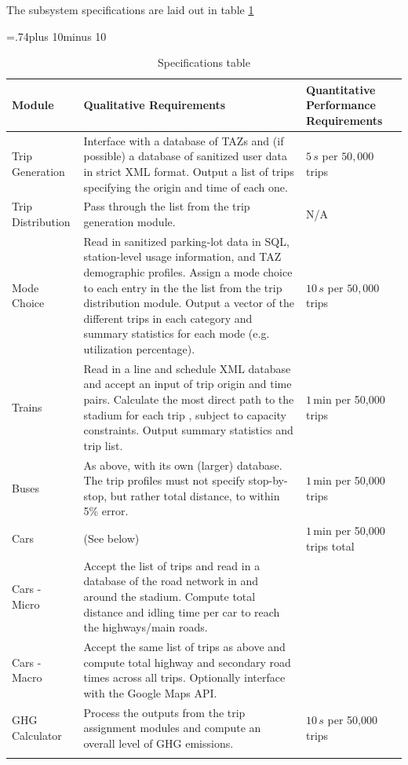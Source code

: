 The subsystem specifications are laid out in table \ref{specs}
\begin{table}[htp]
  \newlength\midcolumnwidth
  \midcolumnwidth=.74\textwidth plus 10\tabcolsep minus 10\tabcolsep
  \centering
  \caption{Specifications table}
  \label{specs}
  \begin{tabular}{%
    >{\raggedright}p{}%
    p{\midcolumnwidth}%
    >{\raggedright\arraybackslash}p{}}
  \firsthline
  \bfseries Module & \bfseries Qualitative Requirements & \bfseries
  Quantitative Performance Requirements \\ \hline
  Trip Generation & Interface with a database of TAZs and (if
  possible) a database of sanitized user data in strict XML format.
  Output a list of trips specifying the origin and time of each one. &
  $5\,s$ per $50,000$ trips \\
  Trip Distribution & Pass through the list from the trip generation
  module. & N/A \\
  Mode Choice & Read in sanitized parking-lot data in SQL,
  station-level usage information, and TAZ demographic profiles.
  Assign a mode choice to each entry in the the list from the trip
  distribution module.
  Output a vector of the different trips in each category and
  summary statistics for each mode (e.g. utilization percentage). &
  $10\, s$ per $50,000$ trips \\
  Trains & Read in a line and schedule XML database
  and accept an input of trip origin and time pairs. Calculate the
  most direct path to the stadium for each trip , subject to capacity
  constraints. Output summary statistics and trip list. & $1\,$min
  per 50,000 trips \\
  Buses & As above, with its own (larger) database. The trip profiles
  must not specify stop-by-stop, but rather total distance, to
  within 5\% error. & $1\,$min per 50,000 trips \\
  Cars & (See below) & $1\,$min per 50,000 trips total \\
  Cars - Micro & Accept the list of trips and read in a database of
  the road network in and around the stadium. Compute total distance
  and idling time per car to reach the highways/main roads. & \\
  Cars - Macro & Accept the same list of trips as above and compute
  total highway and secondary road times across all trips. Optionally
  interface with the Google Maps API. & \\
  GHG Calculator & Process the outputs from the trip assignment
  modules and compute an overall level of GHG emissions. & $10\,s$
  per 50,000 trips \\
  \lasthline
  \end{tabular}
\end{table}
